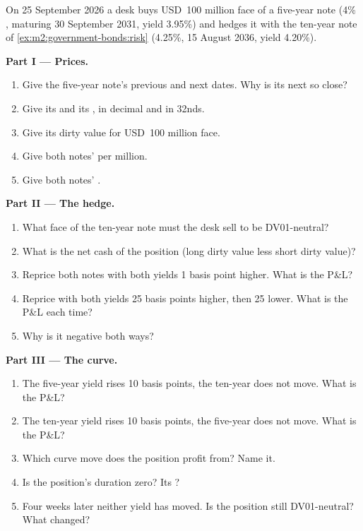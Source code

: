 \begin{problem}\label{pb:m2:government-bonds:1}
On 25 September 2026 a desk buys USD~100 million face of a five-year note (4\%
, maturing 30 September 2031, yield 3.95\%) and hedges it with the ten-year
note of \cref{ex:m2:government-bonds:risk} (4.25\%, 15 August 2036, yield
4.20\%).

\medskip\noindent\textbf{Part I --- Prices.}
\begin{enumerate}
\item Give the five-year note's previous and next  dates. Why is its
next  so close?
\item Give its  and its , in decimal and in 32nds.
\item Give its dirty value for USD~100 million face.
\item Give both notes'  per million.
\item Give both notes' .
\end{enumerate}

\medskip\noindent\textbf{Part II --- The hedge.}
\begin{enumerate}[resume]
\item What face of the ten-year note must the desk sell to be DV01-neutral?
\item What is the net cash of the position (long dirty value less short dirty
value)?
\item Reprice both notes with both yields 1 basis point higher. What is the
P\&L?
\item Reprice with both yields 25 basis points higher, then 25 lower. What is
the P\&L each time?
\item Why is it negative both ways?
\end{enumerate}

\medskip\noindent\textbf{Part III --- The curve.}
\begin{enumerate}[resume]
\item The five-year yield rises 10 basis points, the ten-year does not move.
What is the P\&L?
\item The ten-year yield rises 10 basis points, the five-year does not move.
What is the P\&L?
\item Which curve move does the position profit from? Name it.
\item Is the position's duration zero? Its ?
\item Four weeks later neither yield has moved. Is the position still
DV01-neutral? What changed?
\end{enumerate}


\end{problem}
